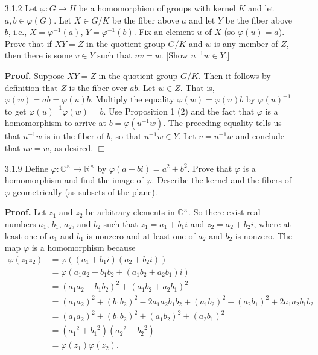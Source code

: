 \documentclass[9pt]{article}
\newcommand{\qed}{\hfill \ensuremath{\Box}}
\newcommand{\C}{\mathbb{C}}
\newcommand{\R}{\mathbb{R}}
\begin{document}
\begin{enumerate}
   \item[3.1.2]   Let $\varphi : G \rightarrow H$ be a homomorphism of groups 
                  with kernel $K$ and let $a, b \in \varphi(G)$. Let $X \in G/K$ 
                  be the  fiber above $a$ and let $Y$ be the fiber above $b$, 
                  i.e., $X = \varphi^{-1}(a)$, $Y = \varphi^{-1}(b)$. Fix an 
                  element $u$ of $X$ (so $\varphi(u) = a$). Prove that if
                  $XY = Z$ in the quotient group $G/K$ and $w$ is any member of 
                  $Z$, then there is some $v \in Y$ such that $uv = w$.
                  [Show $u^{-1}w \in Y$.]
                  
      \textbf{Proof.} Suppose $XY = Z$ in the quotient group $G/K$. Then it
      follows by definition that $Z$ is the fiber over $ab$. Let $w \in Z$.
      That is, $\varphi(w) = ab = \varphi(u)b$. Multiply the equality
      $\varphi(w) = \varphi(u)b$ by $\varphi(u)^{-1}$ to get
      $\varphi(u)^{-1}\varphi(w) = b$. Use Proposition 1 (2) and the fact that
      $\varphi$ is a homomorphism to arrive at $b = \varphi(u^{-1}w)$. The
      preceding equality tells us that $u^{-1}w$ is in the fiber of $b$, so that
      $u^{-1}w \in Y$. Let $v = u^{-1}w$ and conclude that $uv = w$, as desired.
      \qed
   \item[3.1.9]   Define $\varphi : \C^\times \rightarrow \R^\times$ by
                  $\varphi(a + bi) = a^2 + b^2$. Prove that $\varphi$ is a
                  homomorphism and find the image of $\varphi$. Describe the
                  kernel and the fibers of $\varphi$ geometrically (as subsets
                  of the plane).
                  
      \textbf{Proof.} Let $z_1$ and $z_2$ be arbitrary elements in $\C^\times$.
      So there exist real numbers $a_1$, $b_1$, $a_2$, and $b_2$ such that
      $z_1 = a_1 + b_1i$ and $z_2 = a_2 + b_2i$, where at least one of $a_1$ and
      $b_1$ is nonzero and at least one of $a_2$ and $b_2$ is nonzero. The map
      $\varphi$ is a homomorphism because
      \begin{align*}
         \varphi(z_1z_2) &= \varphi((a_1+b_1i)(a_2+b_2i)) \\
            &= \varphi(a_1a_2 - b_1b_2 + (a_1b_2 + a_2b_1)i) \\
            &= (a_1a_2 - b_1b_2)^2 + (a_1b_2 + a_2b_1)^2 \\
            &= (a_1a_2)^2 + (b_1b_2)^2 - 2a_1a_2b_1b_2 + (a_1b_2)^2 +
               (a_2b_1)^2 + 2a_1a_2b_1b_2 \\
            &= (a_1a_2)^2 + (b_1b_2)^2  + (a_1b_2)^2 + (a_2b_1)^2 \\
            &= ({a_1}^2 + {b_1}^2)({a_2}^2 + {b_2}^2) \\
            &= \varphi(z_1)\varphi(z_2).
      \end{align*}
      

\end{enumerate}
\end{document}
